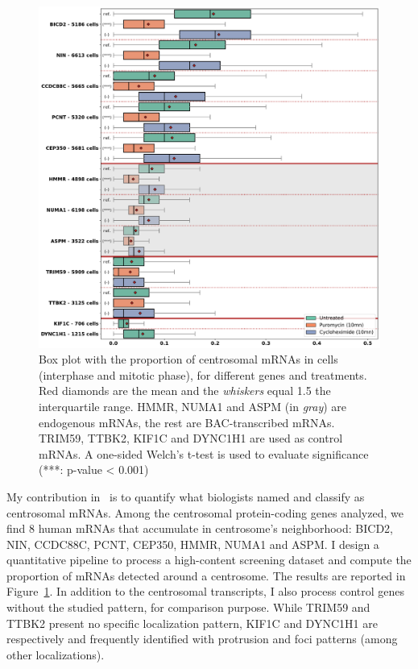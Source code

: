 \begin{figure}[]
    \centering
    \includegraphics[width=\textwidth]{figures/chapter5/plot_rna_centrosome}
    \caption[Box plot with the proportion of centrosomal mRNAs]{Box plot with the proportion of centrosomal mRNAs in cells (interphase and mitotic phase), for different genes and treatments.
	Red diamonds are the mean and the \textit{whiskers} equal 1.5 the interquartile range.
	HMMR, NUMA1 and ASPM (in \textit{gray}) are endogenous mRNAs, the rest are BAC-transcribed mRNAs.
	TRIM59, TTBK2, KIF1C and DYNC1H1 are used as control mRNAs.
	A one-sided Welch’s t-test is used to evaluate significance (***: p-value < 0.001)}
    \label{fig:plot_rna_centrosome}
\end{figure}

My contribution in~\cite{safieddine_choreography_2021} is to quantify what biologists named and classify as centrosomal \ac{mRNA}s.
Among the centrosomal protein-coding genes analyzed, we find 8 human \ac{mRNA}s that accumulate in centrosome's neighborhood: BICD2, NIN, CCDC88C, PCNT, CEP350, HMMR, NUMA1 and ASPM.
I design a quantitative pipeline to process a high-content screening dataset and compute the proportion of \ac{mRNA}s detected around a centrosome.
The results are reported in Figure~\ref{fig:plot_rna_centrosome}.
In addition to the centrosomal transcripts, I also process control genes without the studied pattern, for comparison purpose.
While TRIM59 and TTBK2 present no specific localization pattern, KIF1C and DYNC1H1 are respectively and frequently identified with protrusion and foci patterns (among other localizations).


